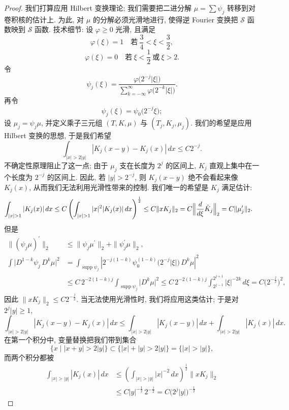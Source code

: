 \begin{proof}
我们打算应用 Hilbert 变换理论; 我们需要把二进分解 $\mu=\sum\psi_j$ 转移到对卷积核的估计上. 为此, 对 $\mu$ 的分解必须光滑地进行, 使得逆 Fourier 变换把 $\mathcal{S}$ 函数映到 $\mathcal{S}$ 函数. 技术细节: 设 $\varphi\geq 0$ 光滑, 且满足
\[
\varphi(\xi)=1\quad\text{若}\ \frac{3}{4}<\xi<\frac{3}{2},
\]
\[
\varphi(\xi)=0\quad\text{若}\ \xi<\frac{1}{2}\ \text{或}\ \xi>2.
\]
令
\[
\psi_{j}(\xi)=\frac{\varphi\bigl(2^{-j}|\xi|\bigr)}{\sum_{k=-\infty}^{\infty}\varphi\bigl(2^{-k}|\xi|\bigr)}.
\]
再令
\[
\psi_{j}(\xi)=\psi_{0}\bigl(2^{-j}\xi\bigr);
\]
设 $\mu_j=\psi_j\mu$, 并定义乘子三元组 $(T,K,\mu)$ 与 $(T_j,K_j,\mu_j)$. 我们的希望是应用 Hilbert 变换的思想, 于是我们希望
\[
\int_{|x|>2|y|}|K_{j}(x-y)-K_{j}(x)|\,dx\leq C2^{-j}.
\]
不确定性原理阻止了这一点; 由于 $\mu_{j}$ 支在长度为 $2^{j}$ 的区间上, $K_{j}$ 直观上集中在一个长度为 $2^{-j}$ 的区间上. 因此, 若 $|y|>2^{-j}$, 则 $K_{j}(x-y)$ 绝不会看起来像 $K_{j}(x)$, 从而我们无法利用光滑性带来的控制. 我们唯一的希望是 $K_{j}$ 满足估计:
\begin{align*}
\int_{|x|>1}|K_{j}(x)|\,dx
&\leq C\left(\int_{|x|>1}|x|^{2}|K_{j}(x)|\,dx\right)^{\frac{1}{2}}
\leq C\|xK_{j}\|_{2}=C\Bigl\|\frac{d}{d\xi}\hat{K}_{j}\Bigr\|_{2}=C\|\mu_{j}'\|_{2}.
\end{align*}
但是
\begin{align*}
\|\left(\psi_{j}\mu\right)^{\prime}\|_{2}&\leq\|\psi_{j}\mu^{\prime}\|_{2}+\|\psi_{j}^{\prime}\mu\|_{2}, \\
\int\bigl|D^{1-k}\psi_{j}\,D^{k}\mu\bigr|^{2}
&=\int_{\operatorname{supp}\psi_{j}}\left|2^{-j(1-k)}\psi_{0}^{(1-k)}\bigl(2^{-j}|\xi|\bigr)\,D^{k}\mu\right|^{2} \\
&\leq C\,2^{-2(1-k)j}\int_{\operatorname{supp}\psi_{j}}\bigl|D^{k}\mu\bigr|^{2}
\leq C\,2^{-2(1-k)j}\int_{2^{j-1}}^{2^{j+1}}|\xi|^{-2k}\,d\xi
=C\bigl(2^{-\frac{j}{2}}\bigr)^{2},
\end{align*}
因此 $\|xK_j\|_2\leq C2^{-\frac{j}{2}}$. 当无法使用光滑性时, 我们将应用这类估计; 于是对 $2^j|y|\geq 1$,
\[
\int_{|x|>2|y|}|K_{j}(x-y)-K_{j}(x)|\,dx
\leq\int_{|x|>2|y|}|K_{j}(x-y)|\,dx+\int_{|x|>2|y|}|K_{j}(x)|\,dx.
\]
在第一个积分中, 变量替换把我们带到集合
\[
\{x \mid |x+y|>2|y|\}\subset\{|x|+|y|>2|y|\}=\{|x|>|y|\},
\]
而两个积分都被
\begin{align*}
\int_{|x|>|y|}|K_{j}(x)|\,dx
&\leq\left(\int_{|x|>|y|}|x|^{-2}\,dx\right)^{\frac{1}{2}}\|xK_{j}\|_{2} \\
&\leq C|y|^{-\frac{1}{2}}\,2^{-\frac{j}{2}}=C\bigl(2^{j}|y|\bigr)^{-\frac{1}{2}}
\end{align*}

\end{proof}
